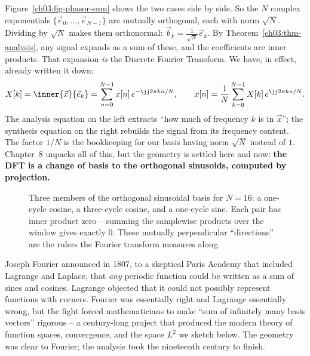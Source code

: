Figure~\ref{ch03:fig-phasor-sum} shows the two cases side by side.
So the $N$ complex exponentials $\{\vec{e}_0,\dots,\vec{e}_{N-1}\}$ are mutually orthogonal, each
with norm $\sqrt{N}$. Dividing by $\sqrt N$ makes them orthonormal:
$\vec{b}_k = \tfrac{1}{\sqrt N}\vec{e}_k$. By
Theorem~\ref{ch03:thm-analysis}, any signal expands as a sum of these, and the coefficients are inner
products. That expansion \emph{is} the Discrete Fourier Transform. We have, in effect, already
written it down:
\[
  X[k] = \inner{\vec{x}}{\vec{e}_k} = \sum_{n=0}^{N-1} x[n]\, e^{-\jj 2\pi k n/N},
  \qquad
  x[n] = \frac{1}{N}\sum_{k=0}^{N-1} X[k]\, e^{\jj 2\pi k n/N}.
\]
The analysis equation on the left extracts ``how much of frequency $k$ is in $\vec{x}$''; the
synthesis equation on the right rebuilds the signal from its frequency content. The factor $1/N$ is
the bookkeeping for our basis having norm $\sqrt N$ instead of $1$. Chapter~8 unpacks all of this,
but the geometry is settled here and now: \textbf{the DFT is a change of basis to the orthogonal
sinusoids, computed by projection.}

\begin{figure}[H]
\centering
{}
\caption{Three members of the orthogonal sinusoidal basis for $N=16$: a one-cycle cosine, a
three-cycle cosine, and a one-cycle sine. Each pair has inner product zero -- summing the samplewise
products over the window gives exactly $0$. These mutually perpendicular ``directions'' are the rulers
the Fourier transform measures along.}
\label{ch03:fig-basis}
\end{figure}

\begin{historybox}
Joseph Fourier announced in 1807, to a skeptical Paris Academy that included Lagrange and Laplace,
that \emph{any} periodic function could be written as a sum of sines and cosines. Lagrange objected
that it could not possibly represent functions with corners. Fourier was essentially right and
Lagrange essentially wrong, but the fight forced mathematicians to make ``sum of infinitely many
basis vectors'' rigorous -- a century-long project that produced the modern theory of function
spaces, convergence, and the space $L^2$ we sketch below. The geometry was clear to Fourier; the
analysis took the nineteenth century to finish.
\end{historybox}

